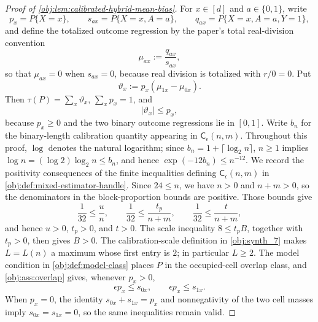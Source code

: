\begin{proof}[Proof of \cref{obj:lem:calibrated-hybrid-mean-bias}]
For \(x\in[d]\) and \(a\in\{0,1\}\), write
\[
p_x=P\{X=x\},\qquad
s_{ax}=P\{X=x,A=a\},\qquad
q_{ax}=P\{X=x,A=a,Y=1\},
\]
and define the totalized outcome regression by the paper's total real-division convention
\[
\mu_{ax}:=\frac{q_{ax}}{s_{ax}},
\]
so that \(\mu_{ax}=0\) when \(s_{ax}=0\), because real division is totalized with \(r/0=0\).  Put
\[
\vartheta_x:=p_x(\mu_{1x}-\mu_{0x}).
\]
Then \(\tau(P)=\sum_x\vartheta_x\), \(\sum_xp_x=1\), and
\[
|\vartheta_x|
\le p_x,
\]
because \(p_x\ge0\) and the two binary outcome regressions lie in \([0,1]\).  Write \(b_n\) for the binary-length calibration quantity appearing in \(\mathsf C_\epsilon(n,m)\).  Throughout this proof, \(\log\) denotes the natural logarithm; since \(b_n=1+\lceil\log_2 n\rceil\), \(n\ge1\) implies \(\log n=(\log 2)\log_2 n\le b_n\), and hence \(\exp(-12b_n)\le n^{-12}\).  We record the positivity consequences of the finite inequalities defining \(\mathsf C_\epsilon(n,m)\) in \cref{obj:def:mixed-estimator-handle}.  Since \(24\le n\), we have \(n>0\) and \(n+m>0\), so the denominators in the block-proportion bounds are positive.  Those bounds give
\[
\frac1{32}\le \frac un,
\qquad
\frac1{32}\le \frac{t_p}{n+m},
\qquad
\frac1{32}\le \frac t{n+m},
\]
and hence \(u>0\), \(t_p>0\), and \(t>0\).  The scale inequality \(8\le t_pB\), together with \(t_p>0\), then gives \(B>0\).  The calibration-scale definition in \cref{obj:synth_7} makes \(L=L(n)\) a maximum whose first entry is \(2\); in particular \(L\ge2\).  The model condition in \cref{obj:def:model-class} places \(P\) in the occupied-cell overlap class, and \cref{obj:ass:overlap} gives, whenever \(p_x>0\),
\[
\epsilon p_x\le s_{0x},
\qquad
\epsilon p_x\le s_{1x}.
\]
When \(p_x=0\), the identity \(s_{0x}+s_{1x}=p_x\) and nonnegativity of the
two cell masses imply \(s_{0x}=s_{1x}=0\), so the same inequalities remain
valid. %


\end{proof}
